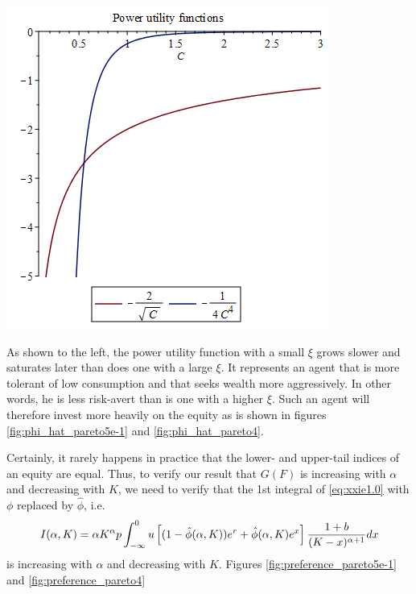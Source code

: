 \documentclass{article}
\begin{document}
\begin{minipage}{0.5\linewidth}
  \includegraphics[width=\textwidth]{power_utilities.png}
\end{minipage}\hfill
\begin{minipage}{0.42\textwidth}
  As shown to the left, the power utility function with a small
  $\xi$ grows slower and saturates later than does one with a large
  $\xi$. It represents an agent that is more tolerant of low
  consumption and that seeks wealth more aggressively. In other
  words, he is less risk-avert than is one with a higher $\xi$.
  Such an agent will therefore invest more heavily on the equity as
  is shown in figures \ref{fig:phi_hat_pareto5e-1} and
  \ref{fig:phi_hat_pareto4}.
\end{minipage}
Certainly, it rarely happens in practice that the lower- and
upper-tail indices of an equity are equal. Thus, to verify our result
that $G(F)$ is increasing with $\alpha$ and decreasing with $K$, we
need to verify that the 1st integral of \eqref{eq:xxie1.0} with $\phi$
replaced by $\hat\phi$, i.e.
\[
I(\alpha, K) = 
  \alpha K^\alpha  p
  \int_{-\infty}^0
  u\left[ (1 - \hat\phi(\alpha, K)) e^r + \hat\phi(\alpha, K) e^x \right]
  {1 + b \over (K - x)^{\alpha + 1}} dx
\]
is increasing with $\alpha$ and decreasing with $K$. Figures
\ref{fig:preference_pareto5e-1} and \ref{fig:preference_pareto4}
\end{document}
